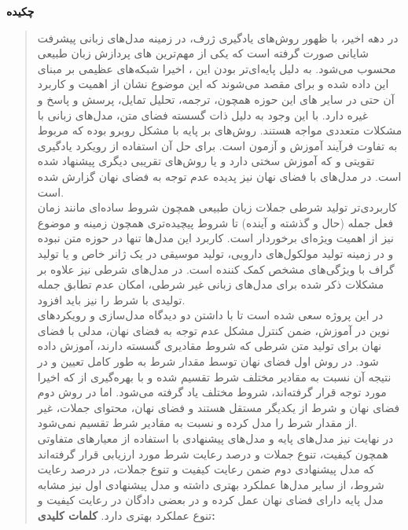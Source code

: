 \thispagestyle{empty}
\centerline{\textbf{\large{چکیده}}}
\begin{quote}
در دهه اخیر، با ظهور روش­‌های یادگیری ژرف، در زمینه مدل‌­های زبانی پیشرفت شایانی صورت گرفته است که یکی از مهم‌ترین \task{}‌های پردازش زبان طبیعی محسوب می‌شود. به دلیل پایه‌ای‌تر بودن این \task{}، اخیرا شبکه‌های عظیمی بر مبنای این \task{}  \pretrain{} داده شده و برای \task{} مقصد \finetuning{} می‌شوند که این موضوع نشان از اهمیت و کاربرد آن حتی در سایر \task{}‌های این حوزه همچون، ترجمه، تحلیل تمایل، پرسش و پاسخ و غیره دارد.
 با این وجود به دلیل ذات گسسته فضای متن، مدل‌های زبانی با مشکلات متعددی مواجه هستند. روش‌های بر پایه \teacherforcing{} با مشکل \expbias{} روبرو بوده که مربوط به تفاوت فرآیند آموزش و آزمون است. برای حل آن استفاده از رويکرد يادگيری تقويتی و \gan{} که آموزش سختی دارد و یا روش‌های تقریبی دیگری پيشنهاد شده است. در مدل‌های با فضای نهان نیز پدیده عدم توجه \decoder{} به فضای نهان گزارش شده است.
\\
\task{}
کاربردی‌­تر تولید شرطی جملات زبان طبیعی همچون شروط ساده­‌ای مانند زمان فعل جمله (حال و گذشته و آینده) تا شروط پیچیده‌­تری همچون زمینه و موضوع نیز از اهمیت ویژه‌ای برخوردار است. کاربرد این مدل‌ها تنها در حوزه متن نبوده و در زمینه تولید مولکول‌های دارویی، تولید موسیقی در یک ژانر خاص و یا تولید گراف با ویژگی‌های مشخص کمک کننده است. در مدل‌های شرطی نیز علاوه بر مشکلات ذکر شده برای مدل‌های زبانی غیر شرطی، امکان عدم تطابق جمله تولیدی با شرط را نیز باید افزود.
\\
در این پروژه سعی شده است تا با داشتن دو دیدگاه مدل‌سازی و رویکرد‌های نوین در آموزش، ضمن کنترل مشکل عدم توجه به فضای نهان، مدلی \generative{} با فضای نهان برای تولید متن شرطی که شروط مقادیری گسسته دارند، آموزش داده شود. در روش اول فضای نهان توسط مقدار شرط به طور کامل تعیین و در نتیجه \priordist{} آن نسبت به مقادیر مختلف شرط تقسیم شده و با بهره‌گیری از \normalizingflownets{} که اخیرا مورد توجه قرار گرفته‌اند، \priordist{} شروط مختلف یاد گرفته می‌شود. اما در روش دوم فضای نهان و شرط از یکدیگر مستقل هستند و فضای نهان، محتوای جملات، غیر از مقدار شرط را مدل کرده و نسبت به مقادیر شرط تقسیم نمی‌شود.
\\
در نهایت نیز مدل‌های پایه و مدل‌های پیشنهادی با استفاده از معیار‌های متفاوتی همچون کیفیت، تنوع جملات و درصد رعایت شرط مورد ارزیابی قرار گرفته‌اند که مدل پیشنهادی دوم ضمن رعایت کیفیت و تنوع جملات، در درصد رعایت شروط، از سایر مدل‌ها عملکرد بهتری داشته و مدل پیشنهادی اول نیز مشابه مدل پایه دارای فضای نهان عمل کرده و در بعضی دادگان در رعایت کیفیت و تنوع عملکرد بهتری دارد.
\vskip 1cm
\textbf{کلمات کلیدی:} 
\end{quote}